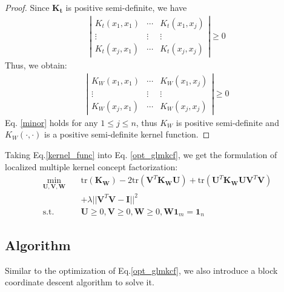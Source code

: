 \documentclass[10pt,journal,compsoc]{IEEEtran}
\newcommand{\st}{\mathrm{s.t.}}
\newcommand{\tr}{\mathrm{tr}}
\begin{document}
\begin{proof}
Since $\mathbf{K_t}$ is positive semi-definite, we have
\begin{align}
\left|
\begin{array}{ccc}
K_t(x_1,x_1) & \cdots & K_t(x_1,x_j) \\
\vdots & \vdots & \vdots \\
K_t(x_j,x_1) & \cdots & K_t(x_j,x_j)
\end{array}
\right| \geq 0
\end{align}
Thus, we obtain:
\begin{align}\label{minor}
\left|
\begin{array}{ccc}
K_W(x_1,x_1) & \cdots & K_W(x_1,x_j) \\
\vdots & \vdots & \vdots \\
K_W(x_j,x_1) & \cdots & K_W(x_j,x_j)
\end{array}
\right| \geq 0
\end{align}
Eq. \eqref{minor} holds for any $1 \leq j\leq n$, thus $K_W$ is positive semi-definite and $K_W(\cdot,\cdot)$ is a positive semi-definite kernel function.
\end{proof}

Taking Eq.\eqref{kernel_func} into Eq. \eqref{opt_glmkcf}, we get the formulation of localized multiple kernel concept factorization:
\begin{align}\label{opt_llmkcf}
\min_{\mathbf{U}, \mathbf{V}, \mathbf{W}} \quad & \tr(\mathbf{K}_{\mathbf{W}}) - 2 \tr(\mathbf{V}^T \mathbf{K}_{\mathbf{W}} \mathbf{U}) + \tr(\mathbf{U}^T \mathbf{K}_{\mathbf{W}} \mathbf{U} \mathbf{V}^T \mathbf{V}) \nonumber \\
& +  \lambda ||\mathbf{V}^T \mathbf{V} - \mathbf{I}||^2 \\
\st \quad & \mathbf{U} \geq 0,  \mathbf{V} \geq 0, \mathbf{W} \geq 0, \mathbf{W}\mathbf{1}_{m} = \mathbf{1}_{n}  \nonumber
\end{align}

\subsection{Algorithm}
Similar to the optimization of Eq.\eqref{opt_glmkcf}, we also introduce a block coordinate descent algorithm to solve it.
\end{document}
